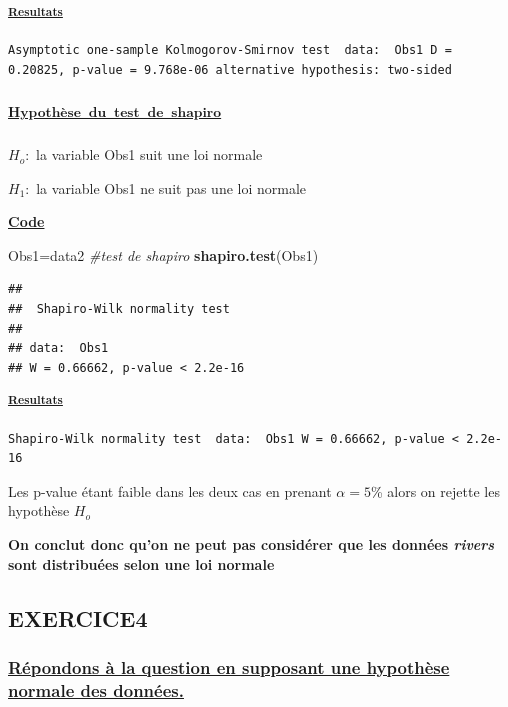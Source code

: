 \documentclass[
]{article}
\newenvironment{Shaded}{\begin{snugshade}}{\end{snugshade}}
\newcommand{\CommentTok}[1]{\textcolor[rgb]{0.56,0.35,0.01}{\textit{#1}}}
\newcommand{\FunctionTok}[1]{\textcolor[rgb]{0.13,0.29,0.53}{\textbf{#1}}}
\newcommand{\NormalTok}[1]{#1}
\newcommand{\OtherTok}[1]{\textcolor[rgb]{0.56,0.35,0.01}{#1}}
\begin{document}
\textsuperscript{\ul{\textbf{Resultats}}}

\begin{verbatim}
Asymptotic one-sample Kolmogorov-Smirnov test  data:  Obs1 D = 0.20825, p-value = 9.768e-06 alternative hypothesis: two-sided
\end{verbatim}

\subsubsection{\texorpdfstring{\textsuperscript{\ul{Hypothèse~du~test~de~shapiro}}}{Hypothèse~du~test~de~shapiro}}\label{hypothuxe8se-du-test-de-shapiro}

\(H_o:\) la variable Obs1 suit une loi normale

\(H_1:\) la variable Obs1 ne suit pas une loi normale

\ul{\textbf{Code}}

\begin{Shaded}
\begin{Highlighting}[]
\NormalTok{Obs1}\OtherTok{=}\NormalTok{data2}
\CommentTok{\#test de shapiro}
\FunctionTok{shapiro.test}\NormalTok{(Obs1)}
\end{Highlighting}
\end{Shaded}

\begin{verbatim}
## 
##  Shapiro-Wilk normality test
## 
## data:  Obs1
## W = 0.66662, p-value < 2.2e-16
\end{verbatim}

\textsuperscript{\ul{\textbf{Resultats}}}

\begin{verbatim}
Shapiro-Wilk normality test  data:  Obs1 W = 0.66662, p-value < 2.2e-16
\end{verbatim}

Les p-value étant faible dans les deux cas en prenant \(\alpha=5\)\%
alors on rejette les hypothèse \(H_o\)

\textbf{On conclut donc qu'on ne peut pas considérer que les données
\emph{rivers} sont distribuées selon une loi normale}

\subsection{EXERCICE4}\label{exercice4}

\subsubsection{\texorpdfstring{\ul{\textbf{Répondons à la question en
supposant une hypothèse normale des
données.}}}{Répondons à la question en supposant une hypothèse normale des données.}}\label{ruxe9pondons-uxe0-la-question-en-supposant-une-hypothuxe8se-normale-des-donnuxe9es.}
\end{document}
